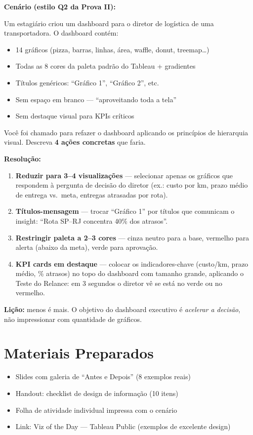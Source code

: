 \begin{SolvedBox}
\textbf{Cenário (estilo Q2 da Prova II):}

Um estagiário criou um dashboard para o diretor de logística de uma
transportadora. O dashboard contém:
\begin{itemize}
  \item 14 gráficos (pizza, barras, linhas, área, waffle, donut, treemap\ldots)
  \item Todas as 8 cores da paleta padrão do Tableau + gradientes
  \item Títulos genéricos: ``Gráfico 1'', ``Gráfico 2'', etc.
  \item Sem espaço em branco — ``aproveitando toda a tela''
  \item Sem destaque visual para KPIs críticos
\end{itemize}

Você foi chamado para refazer o dashboard aplicando os princípios de
hierarquia visual. Descreva \textbf{4 ações concretas} que faria.

\textbf{Resolução:}
\begin{enumerate}
  \item \textbf{Reduzir para 3--4 visualizações} — selecionar apenas os
  gráficos que respondem à pergunta de decisão do diretor (ex.: custo por
  km, prazo médio de entrega vs.\ meta, entregas atrasadas por rota).
  \item \textbf{Títulos-mensagem} — trocar ``Gráfico 1'' por títulos que
  comunicam o insight: ``Rota SP--RJ concentra 40\% dos atrasos''.
  \item \textbf{Restringir paleta a 2--3 cores} — cinza neutro para a base,
  vermelho para alerta (abaixo da meta), verde para aprovação.
  \item \textbf{KPI cards em destaque} — colocar os indicadores-chave
  (custo/km, prazo médio, \% atrasos) no topo do dashboard com tamanho
  grande, aplicando o Teste do Relance: em 3 segundos o diretor vê se
  está no verde ou no vermelho.
\end{enumerate}

\textbf{Lição:} menos é mais. O objetivo do dashboard executivo é
\emph{acelerar a decisão}, não impressionar com quantidade de gráficos.
\end{SolvedBox}

\section{Materiais Preparados}
\begin{itemize}
  \item Slides com galeria de ``Antes e Depois'' (8 exemplos reais)
  \item Handout: checklist de design de informação (10 itens)
  \item Folha de atividade individual impressa com o cenário
  \item Link: Viz of the Day — Tableau Public (exemplos de excelente design)
\end{itemize}

